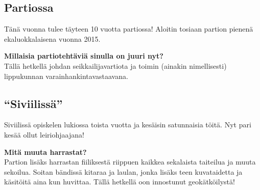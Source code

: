\begin{multicols}{2}

\subsection*{Partiossa}
Tänä vuonna tulee täyteen 10 vuotta partiossa! Aloitin tosiaan partion pienenä ekaluokkalaisena vuonna 2015.

\vspace*{0.16cm}
\noindent\textbf{Millaisia partiotehtäviä sinulla on juuri nyt?}\\
Tällä hetkellä johdan seikkailijavartiota ja toimin (ainakin nimellisesti) lippukunnan varainhankintavastaavana.

\vspace*{\fill}
\columnbreak
\subsection*{``Siviilissä''}
Siviilissä opiskelen lukiossa toista vuotta ja kesäisin satunnaisia töitä. Nyt pari kesää ollut leiriohjaajana!

\vspace*{0.16cm}
\noindent\textbf{Mitä muuta harrastat?}\\
Partion lisäks harrastan fiiliksestä riippuen kaikkea sekalaista taiteilua ja muuta sekoilua. Soitan bändissä kitaraa ja laulan, jonka lisäks teen kuvataidetta ja käsitöitä aina kun huvittaa. Tällä hetkellä oon innostunut geokätköilystä!

\end{multicols}

